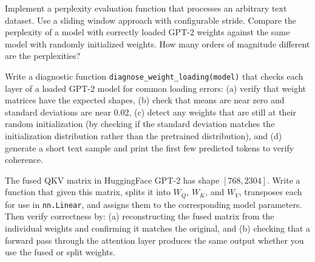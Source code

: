 \begin{problem}[3]
  Implement a perplexity evaluation function that processes an arbitrary
  text dataset. Use a sliding window approach with configurable stride.
  Compare the perplexity of a model with correctly loaded GPT-2 weights
  against the same model with randomly initialized weights. How many
  orders of magnitude different are the perplexities?
\end{problem}

\begin{problem}[4]
  Write a diagnostic function \texttt{diagnose\_weight\_loading(model)} that
  checks each layer of a loaded GPT-2 model for common loading errors:
  (a) verify that weight matrices have the expected shapes,
  (b) check that means are near zero and standard deviations are near 0.02,
  (c) detect any weights that are still at their random initialization
  (by checking if the standard deviation matches the initialization
  distribution rather than the pretrained distribution), and
  (d) generate a short text sample and print the first few predicted tokens
  to verify coherence.
\end{problem}

\begin{problem}[5]
  The fused QKV matrix in HuggingFace GPT-2 has shape $[768, 2304]$. Write
  a function that given this matrix, splits it into $W_Q$, $W_K$, and
  $W_V$, transposes each for use in \texttt{nn.Linear}, and assigns them
  to the corresponding model parameters. Then verify correctness by:
  (a) reconstructing the fused matrix from the individual weights and
  confirming it matches the original, and (b) checking that a forward pass
  through the attention layer produces the same output whether you use
  the fused or split weights.
\end{problem}
